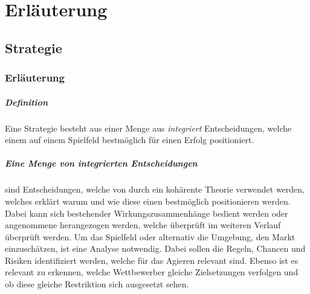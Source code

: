 \pagebreak
\chapter{Erläuterung}

\section{Strategie} \label{Appendix_Erlaeuterung_Strategie}

\subsection{Erläuterung}
\paragraph{Definition}
Eine Strategie besteht aus einer Menge aus \textit{integriert} Entscheidungen, welche einem auf einem Spielfeld bestmöglich für einen Erfolg positioniert.\\





\paragraph{Eine Menge von integrierten Entscheidungen} sind Entscheidungen, welche von durch ein kohärente Theorie verwendet werden, welches erklärt warum und wie diese einen bestmöglich positionieren werden. Dabei kann sich bestehender Wirkungszusammenhänge bedient werden oder angenommene herangezogen werden, welche überprüft im weiteren Verlauf überprüft werden. Um das Spielfeld oder alternativ die Umgebung, den Markt einzuschätzen, ist eine Analyse notwendig. Dabei sollen die Regeln, Chancen und Risiken identifiziert werden, welche für das Agieren relevant sind. Ebenso ist es relevant zu erkennen, welche Wettbewerber gleiche Zielsetzungen verfolgen und ob diese gleiche Restriktion sich ausgesetzt sehen.\\

